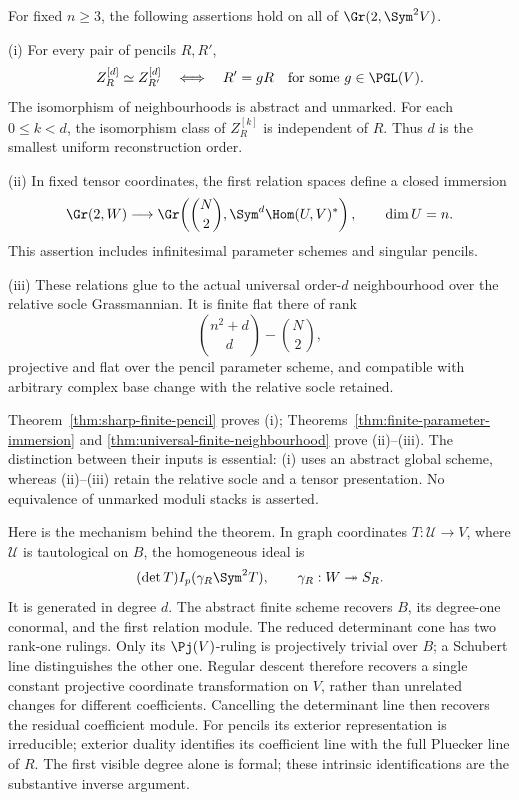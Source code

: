 \begin{theorem}
\label{thm:principal-finite-v143}
For fixed \(n\ge3\), the following assertions hold on all of
\(\Gr(2,\Sym^2V)\).

\smallskip
\noindent\textup{(i)} For every pair of pencils \(R,R'\),
\[
 Z_R^{[d]}\simeq Z_{R'}^{[d]}
 \quad\Longleftrightarrow\quad
 R'=gR\quad\hbox{for some }g\in\PGL(V).
\]
The isomorphism of neighbourhoods is abstract and unmarked.
For each \(0\le k<d\), the isomorphism class of \(Z_R^{[k]}\)
is independent of \(R\).  Thus \(d\) is the smallest uniform
reconstruction order.

\smallskip
\noindent\textup{(ii)} In fixed tensor coordinates, the first relation
spaces define a closed immersion
\[
 \Gr(2,W)\longrightarrow
 \Gr\!\left(\binom N2,\Sym^d\Hom(U,V)^*\right),\qquad \dim U=n.
\]
This assertion includes infinitesimal parameter schemes and singular
pencils.

\smallskip
\noindent\textup{(iii)} These relations glue to the actual universal
order-\(d\) neighbourhood over the relative socle Grassmannian.
It is finite flat there of rank
\[
                  \binom{n^2+d}{d}-\binom N2,
\]
projective and flat over the pencil parameter scheme, and compatible
with arbitrary complex base change with the relative socle retained.
\end{theorem}

Theorem~\ref{thm:sharp-finite-pencil} proves \textup{(i)};
Theorems~\ref{thm:finite-parameter-immersion} and
\ref{thm:universal-finite-neighbourhood} prove \textup{(ii)--(iii)}.
The distinction between their inputs is essential: \textup{(i)} uses
an abstract global scheme, whereas \textup{(ii)--(iii)} retain the
relative socle and a tensor presentation.  No equivalence of unmarked
moduli stacks is asserted.

Here is the mechanism behind the theorem.  In graph coordinates
\(T:\mathcal U\to V\), where \(\mathcal U\) is tautological on
\(B\), the homogeneous ideal is
\[
          (\det T)I_p(\gamma_R\Sym^2T),
          \qquad \gamma_R:W\twoheadrightarrow S_R.
\]
It is generated in degree \(d\).  The abstract finite scheme recovers
\(B\), its degree-one conormal, and the first relation module.
The reduced determinant cone has two rank-one rulings.  Only its
\(\Pj(V)\)-ruling is projectively trivial over \(B\); a
Schubert line distinguishes the other one.  Regular descent therefore
recovers a single constant projective coordinate transformation on
\(V\), rather than unrelated changes for different coefficients.
Cancelling the determinant line then recovers the residual coefficient
module.  For pencils its exterior representation is irreducible;
exterior duality identifies its coefficient line with the full
Pluecker line of \(R\).  The first visible degree alone is formal;
these intrinsic identifications are the substantive inverse argument.

